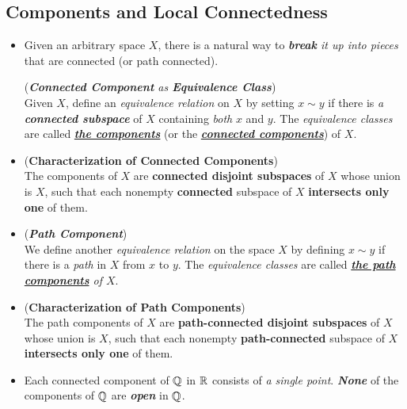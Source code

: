 \documentclass[11pt]{article}
\begin{document}
\subsection{Components and Local Connectedness}
\begin{itemize}
\item Given an arbitrary space $X$, there is a natural way to \emph{\textbf{break} it up into pieces} that are connected (or path connected). 
\begin{definition} (\emph{\textbf{Connected Component} as \textbf{Equivalence Class}})\\
Given $X$, define an \emph{equivalence relation} on $X$ by setting $x \sim y$ if there is \emph{a \textbf{connected subspace}} of $X$ containing \emph{both} $x$ and $y$. The \emph{equivalence classes} are called \underline{\emph{\textbf{the components}}} (or the \underline{\emph{\textbf{connected components}}}) of $X$.
\end{definition}

\item \begin{proposition} (\textbf{Characterization of Connected Components})\\
The components of $X$ are \textbf{connected disjoint subspaces} of $X$ whose union is $X$, such that each nonempty \textbf{connected} subspace of $X$ \textbf{intersects only one} of them.
\end{proposition}

\item \begin{definition}(\emph{\textbf{Path Component}})\\
We define another \emph{equivalence relation} on the space $X$ by defining $x \sim y$ if there is a \emph{path} in $X$ from $x$ to $y$. The \emph{equivalence classes} are called \emph{\underline{\textbf{the path components}} of $X$}.
\end{definition}

\item \begin{proposition} (\textbf{Characterization of Path Components})\\
The path components of $X$ are \textbf{path-connected disjoint subspaces} of $X$ whose union is $X$, such that each nonempty \textbf{path-connected} subspace of $X$ \textbf{intersects only one} of them.
\end{proposition}

\item \begin{example}
Each connected component of ${\mathbb Q}$ in ${\mathbb R}$ consists of \emph{a single point}. \emph{\textbf{None}} of the components of ${\mathbb Q}$ are \emph{\textbf{open}} in ${\mathbb Q}$. 
\end{example}


\end{itemize}
\end{document}
